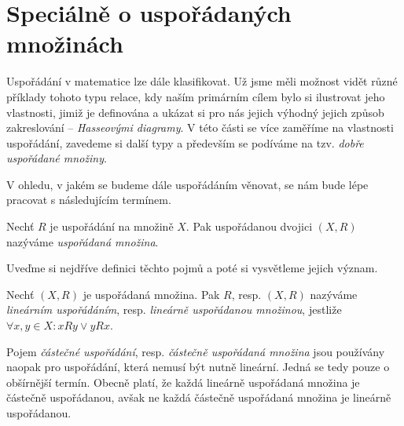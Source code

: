 \section{Speciálně o uspořádaných množinách}
Uspořádání v matematice lze dále klasifikovat. Už jsme měli možnost vidět různé příklady tohoto typu relace, kdy naším primárním cílem bylo si ilustrovat jeho vlastnosti, jimiž je definována a ukázat si pro nás jejich výhodný jejich způsob zakreslování -- \emph{Hasseovými diagramy}. V této části se více zaměříme na vlastnosti uspořádání, zavedeme si další typy a především se podíváme na tzv. \emph{dobře uspořádané množiny}.\par
V ohledu, v jakém se budeme dále uspořádáním věnovat, se nám bude lépe pracovat s následujícím termínem.
\begin{definition}
    Nechť $R$ je uspořádání na množině $X$. Pak uspořádanou dvojici $(X,R)$ nazýváme \emph{uspořádaná množina}.
\end{definition}
Uveďme si nejdříve definici těchto pojmů a poté si vysvětleme jejich význam.
\begin{definition}
    Nechť $(X,R)$ je uspořádaná množina. Pak $R$, resp. $(X,R)$ nazýváme \emph{lineárním uspořádáním}, resp. \emph{lineárně uspořádanou množinou}, jestliže $\forall x,y\in X: xRy \lor yRx$.
\end{definition}
Pojem \emph{částečné uspořádání}, resp. \emph{částečně uspořádaná množina} jsou používány naopak pro uspořádání, která nemusí být nutně lineární. Jedná se tedy pouze o obšírnější termín. Obecně platí, že každá lineárně uspořádaná množina je částečně uspořádanou, avšak ne každá částečně uspořádaná množina je lineárně uspořádanou.
